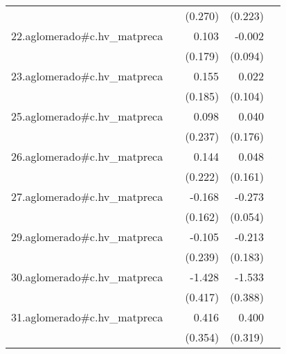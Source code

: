 {\begin{longtable}{l*{4}{D{.}{.}{-1}}}
            &                     &     (0.270)         &     (0.223)         &                     \\
\addlinespace
22.aglomerado#c.hv\_matpreca&                     &       0.103         &      -0.002         &                     \\
            &                     &     (0.179)         &     (0.094)         &                     \\
\addlinespace
23.aglomerado#c.hv\_matpreca&                     &       0.155         &       0.022         &                     \\
            &                     &     (0.185)         &     (0.104)         &                     \\
\addlinespace
25.aglomerado#c.hv\_matpreca&                     &       0.098         &       0.040         &                     \\
            &                     &     (0.237)         &     (0.176)         &                     \\
\addlinespace
26.aglomerado#c.hv\_matpreca&                     &       0.144         &       0.048         &                     \\
            &                     &     (0.222)         &     (0.161)         &                     \\
\addlinespace
27.aglomerado#c.hv\_matpreca&                     &      -0.168         &      -0.273\sym{***}&                     \\
            &                     &     (0.162)         &     (0.054)         &                     \\
\addlinespace
29.aglomerado#c.hv\_matpreca&                     &      -0.105         &      -0.213         &                     \\
            &                     &     (0.239)         &     (0.183)         &                     \\
\addlinespace
30.aglomerado#c.hv\_matpreca&                     &      -1.428\sym{***}&      -1.533\sym{***}&                     \\
            &                     &     (0.417)         &     (0.388)         &                     \\
\addlinespace
31.aglomerado#c.hv\_matpreca&                     &       0.416         &       0.400         &                     \\
            &                     &     (0.354)         &     (0.319)         &                     \\

\end{longtable}}
